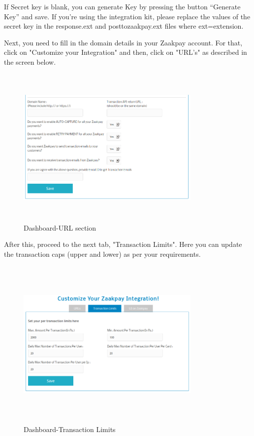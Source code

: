 \documentclass{article}
\begin{document}
If Secret key is blank, you can generate Key by pressing the button “Generate Key” and save. If you're using the integration kit, please replace the values of the secret key in the response.ext and posttozaakpay.ext files where ext=extension.

Next, you need to fill in the domain details in your Zaakpay account. For that, click on "Customize your Integration" and then, click on "URL's" as described in the screen below.

\begin{figure}[H]
\centering
\caption{Dashboard-URL section}
\includegraphics[width=0.8\textwidth,height=3.1in]{Data_not_complete.png}
\end{figure}

After this, proceed to the next tab, "Transaction Limits". Here you can update the transaction caps (upper and lower) as per your requirements.

\begin{figure}[H]
\centering
\caption{Dashboard-Transaction Limits}
\includegraphics[width=0.8\textwidth,height=3.3in]{Transaction_limits.png}
\end{figure}
\end{document}
